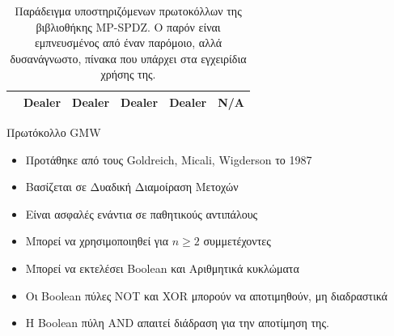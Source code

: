 \documentclass[10pt]{beamer}
\begin{document}
\begin{frame}[fragile,c]{}
\begin{block}{}
\begin{table}[h!]
{\begin{tabular}{|c|l|ll|ll|}
                        & Dealer                                                               & \multicolumn{1}{l|}{Dealer}                      & Dealer                 & \multicolumn{1}{l|}{Dealer}                      & N/A               \\ \hline
                    \end{tabular}
                }
                \caption{Παράδειγμα υποστηριζόμενων πρωτοκόλλων της βιβλιοθήκης MP-SPDZ. Ο παρόν είναι εμπνευσμένος από έναν παρόμοιο, αλλά δυσανάγνωστο, πίνακα που υπάρχει στα εγχειρίδια χρήσης της.}
                \label{fig:mp-sdpz-protocols}
            \end{table}
        \end{block}
    \end{frame}
    \begin{frame}{Πρωτόκολλο GMW}
        \begin{block}{}
            \begin{itemize}
                \item Προτάθηκε από τους Goldreich, Micali, Wigderson το 1987
                \item Βασίζεται σε Δυαδική Διαμοίραση Μετοχών
                \item Είναι ασφαλές ενάντια σε παθητικούς αντιπάλους
                \item Μπορεί να χρησιμοποιηθεί για $n \ge 2$ συμμετέχοντες
                \item Μπορεί να εκτελέσει Boolean και Αριθμητικά κυκλώματα
                \item Οι Boolean πύλες NOT και XOR μπορούν να αποτιμηθούν, μη διαδραστικά
                \item Η Boolean πύλη AND απαιτεί διάδραση για την αποτίμηση της.
            \end{itemize}
        \end{block}
    \end{frame}
\end{document}
